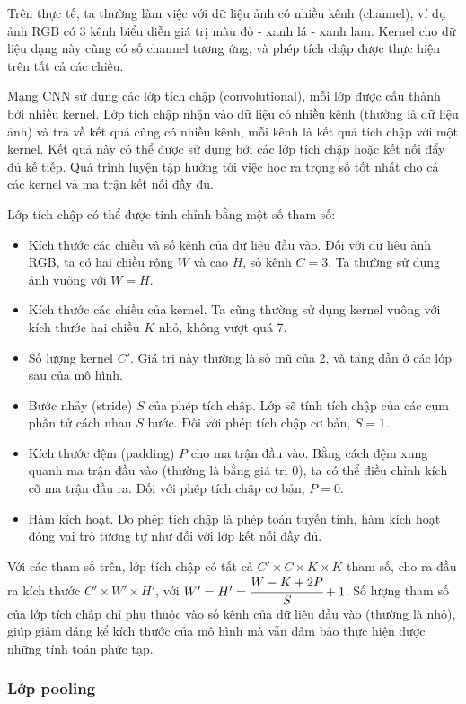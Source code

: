 \documentclass[12pt]{extreport}
\begin{document}
Trên thực tế, ta thường làm việc với dữ liệu ảnh có nhiều kênh (channel), ví dụ ảnh RGB có 3 kênh biểu diễn giá trị màu đỏ - xanh lá - xanh lam. Kernel cho dữ liệu dạng này cũng có số channel tương ứng, và phép tích chập được thực hiện trên tất cả các chiều.

Mạng CNN sử dụng các lớp tích chập (convolutional), mỗi lớp được cấu thành bởi nhiều kernel. Lớp tích chập nhận vào dữ liệu có nhiều kênh (thường là dữ liệu ảnh) và trả về kết quả cũng có nhiều kênh, mỗi kênh là kết quả tích chập với một kernel. Kết quả này có thể được sử dụng bởi các lớp tích chập hoặc kết nối đẩy đủ kế tiếp. Quá trình luyện tập hướng tới việc học ra trọng số tốt nhất cho cả các kernel và ma trận kết nối đầy đủ.

Lớp tích chập có thể được tinh chỉnh bằng một số tham số:
\begin{itemize}
    \item Kích thước các chiều và số kênh của dữ liệu đầu vào. Đối với dữ liệu ảnh RGB, ta có hai chiều rộng $ W $ và cao $ H $, số kênh $ C = 3 $. Ta thường sử dụng ảnh vuông với $ W = H $.
    \item Kích thước các chiều của kernel. Ta cũng thường sử dụng kernel vuông với kích thước hai chiều $ K $ nhỏ, không vượt quá 7.
    \item Số lượng kernel $ C' $. Giá trị này thường là số mũ của 2, và tăng dần ở các lớp sau của mô hình.
    \item Bước nhảy (stride) $ S $ của phép tích chập. Lớp sẽ tính tích chập của các cụm phần tử cách nhau $ S $ bước. Đối với phép tích chập cơ bản, $ S = 1 $.
    \item Kích thước đệm (padding) $ P $ cho ma trận đầu vào. Bằng cách đệm xung quanh ma trận đầu vào (thường là bằng giá trị 0), ta có thể điều chỉnh kích cỡ ma trận đầu ra. Đối với phép tích chập cơ bản, $ P = 0 $.
    \item Hàm kích hoạt. Do phép tích chập là phép toán tuyến tính, hàm kích hoạt đóng vai trò tương tự như đối với lớp kết nối đầy đủ.
\end{itemize}

Với các tham số trên, lớp tích chập có tất cả $ C' \times C \times K \times K $ tham số, cho ra đầu ra kích thước $ C' \times W' \times H' $, với $ W' = H' = \cfrac{W - K + 2P}{S} + 1 $. Số lượng tham số của lớp tích chập chỉ phụ thuộc vào số kênh của dữ liệu đầu vào (thường là nhỏ), giúp giảm đáng kể kích thước của mô hình mà vẫn đảm bảo thực hiện được những tính toán phức tạp.

\subsubsection{Lớp pooling}
\end{document}

